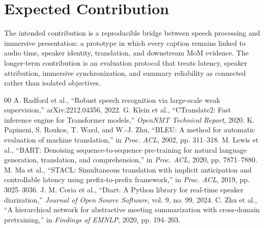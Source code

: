 \documentclass[conference]{IEEEtran}
\begin{document}
\section{Expected Contribution}
The intended contribution is a reproducible bridge between speech processing and immersive presentation: a prototype in which every caption remains linked to audio time, speaker identity, translation, and downstream MoM evidence. The longer-term contribution is an evaluation protocol that treats latency, speaker attribution, immersive synchronization, and summary reliability as connected rather than isolated objectives.

\begin{thebibliography}{00}
 A. Radford et al., ``Robust speech recognition via large-scale weak supervision,'' arXiv:2212.04356, 2022.
 G. Klein et al., ``CTranslate2: Fast inference engine for Transformer models,'' \textit{OpenNMT Technical Report}, 2020.
 K. Papineni, S. Roukos, T. Ward, and W.-J. Zhu, ``BLEU: A method for automatic evaluation of machine translation,'' in \textit{Proc. ACL}, 2002, pp. 311--318.
 M. Lewis et al., ``BART: Denoising sequence-to-sequence pre-training for natural language generation, translation, and comprehension,'' in \textit{Proc. ACL}, 2020, pp. 7871--7880.
 M. Ma et al., ``STACL: Simultaneous translation with implicit anticipation and controllable latency using prefix-to-prefix framework,'' in \textit{Proc. ACL}, 2019, pp. 3025--3036.
 J. M. Coria et al., ``Diart: A Python library for real-time speaker diarization,'' \textit{Journal of Open Source Software}, vol. 9, no. 99, 2024.
 C. Zhu et al., ``A hierarchical network for abstractive meeting summarization with cross-domain pretraining,'' in \textit{Findings of EMNLP}, 2020, pp. 194--203.
\end{thebibliography}
\end{document}
